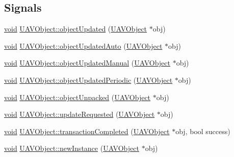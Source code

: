 \subsection*{\-Signals}
\begin{DoxyCompactItemize}
\item 
\hyperlink{group___u_a_v_objects_plugin_ga444cf2ff3f0ecbe028adce838d373f5c}{void} \hyperlink{group___u_a_v_objects_plugin_ga9aac3ae5395f63249cd821e0e5be5bf2}{\-U\-A\-V\-Object\-::object\-Updated} (\hyperlink{class_u_a_v_object}{\-U\-A\-V\-Object} $\ast$obj)
\item 
\hyperlink{group___u_a_v_objects_plugin_ga444cf2ff3f0ecbe028adce838d373f5c}{void} \hyperlink{group___u_a_v_objects_plugin_ga568cdde04946e82d60a3707fefdd2572}{\-U\-A\-V\-Object\-::object\-Updated\-Auto} (\hyperlink{class_u_a_v_object}{\-U\-A\-V\-Object} $\ast$obj)
\item 
\hyperlink{group___u_a_v_objects_plugin_ga444cf2ff3f0ecbe028adce838d373f5c}{void} \hyperlink{group___u_a_v_objects_plugin_ga347d21d00c26e23b58dae5510bdc3a7d}{\-U\-A\-V\-Object\-::object\-Updated\-Manual} (\hyperlink{class_u_a_v_object}{\-U\-A\-V\-Object} $\ast$obj)
\item 
\hyperlink{group___u_a_v_objects_plugin_ga444cf2ff3f0ecbe028adce838d373f5c}{void} \hyperlink{group___u_a_v_objects_plugin_ga1ba37e7a5eafe1d5a598b2dfb877d2f0}{\-U\-A\-V\-Object\-::object\-Updated\-Periodic} (\hyperlink{class_u_a_v_object}{\-U\-A\-V\-Object} $\ast$obj)
\item 
\hyperlink{group___u_a_v_objects_plugin_ga444cf2ff3f0ecbe028adce838d373f5c}{void} \hyperlink{group___u_a_v_objects_plugin_ga2b9ae613f54e59b358dbf2e31d32d9ad}{\-U\-A\-V\-Object\-::object\-Unpacked} (\hyperlink{class_u_a_v_object}{\-U\-A\-V\-Object} $\ast$obj)
\item 
\hyperlink{group___u_a_v_objects_plugin_ga444cf2ff3f0ecbe028adce838d373f5c}{void} \hyperlink{group___u_a_v_objects_plugin_ga13ce31a6262476db602eec857d9b40c1}{\-U\-A\-V\-Object\-::update\-Requested} (\hyperlink{class_u_a_v_object}{\-U\-A\-V\-Object} $\ast$obj)
\item 
\hyperlink{group___u_a_v_objects_plugin_ga444cf2ff3f0ecbe028adce838d373f5c}{void} \hyperlink{group___u_a_v_objects_plugin_gafac716c4828b4506f6982f79fc7827c2}{\-U\-A\-V\-Object\-::transaction\-Completed} (\hyperlink{class_u_a_v_object}{\-U\-A\-V\-Object} $\ast$obj, bool success)
\item 
\hyperlink{group___u_a_v_objects_plugin_ga444cf2ff3f0ecbe028adce838d373f5c}{void} \hyperlink{group___u_a_v_objects_plugin_gadf709e4ec60d0dfc3cc4a12012c400f3}{\-U\-A\-V\-Object\-::new\-Instance} (\hyperlink{class_u_a_v_object}{\-U\-A\-V\-Object} $\ast$obj)

\end{DoxyCompactItemize}
